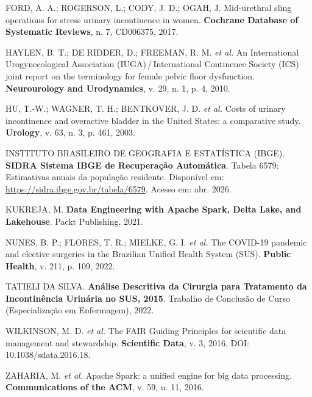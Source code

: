 \documentclass[12pt,a4paper,oneside]{article}
\begin{document}
\begin{singlespace}
\noindent\hangindent=1.25cm
FORD, A. A.; ROGERSON, L.; CODY, J. D.; OGAH, J. Mid-urethral sling
operations for stress urinary incontinence in women.
\textbf{Cochrane Database of Systematic Reviews}, n. 7, CD006375,
2017.\par\smallskip

\noindent\hangindent=1.25cm
HAYLEN, B. T.; DE RIDDER, D.; FREEMAN, R. M. \textit{et al.} An
International Urogynecological Association
(IUGA)\,/\,International Continence Society (ICS) joint report on
the terminology for female pelvic floor dysfunction.
\textbf{Neurourology and Urodynamics}, v. 29, n. 1,
p. 4, 2010.\par\smallskip

\noindent\hangindent=1.25cm
HU, T.-W.; WAGNER, T. H.; BENTKOVER, J. D. \textit{et al.} Costs of
urinary incontinence and overactive bladder in the United States: a
comparative study. \textbf{Urology}, v. 63, n. 3,
p. 461, 2003.\par\smallskip

\noindent\hangindent=1.25cm
INSTITUTO BRASILEIRO DE GEOGRAFIA E ESTATÍSTICA (IBGE).
\textbf{SIDRA \textemdash{} Sistema IBGE de Recuperação Automática}.
Tabela 6579: Estimativas anuais da população residente. Disponível em:
\url{https://sidra.ibge.gov.br/tabela/6579}. Acesso em: abr. 2026.
\par\smallskip

\noindent\hangindent=1.25cm
KUKREJA, M. \textbf{Data Engineering with Apache Spark, Delta Lake,
and Lakehouse}. Packt Publishing, 2021.\par\smallskip

\noindent\hangindent=1.25cm
NUNES, B. P.; FLORES, T. R.; MIELKE, G. I. \textit{et al.} The
COVID-19 pandemic and elective surgeries in the Brazilian Unified
Health System (SUS). \textbf{Public Health}, v. 211,
p. 109, 2022.\par\smallskip

\noindent\hangindent=1.25cm
TATIELI DA SILVA. \textbf{Análise Descritiva da Cirurgia para
Tratamento da Incontinência Urinária no SUS, 2015}.
Trabalho de Conclusão de Curso (Especialização em Enfermagem),
2022.\par\smallskip

\noindent\hangindent=1.25cm
WILKINSON, M. D. \textit{et al.} The FAIR Guiding Principles for
scientific data management and stewardship. \textbf{Scientific Data},
v. 3, 2016. DOI: 10.1038/sdata.2016.18.\par\smallskip

\noindent\hangindent=1.25cm
ZAHARIA, M. \textit{et al.} Apache Spark: a unified engine for big
data processing. \textbf{Communications of the ACM}, v. 59, n. 11,
2016.\par\smallskip
\end{singlespace}
\end{document}
